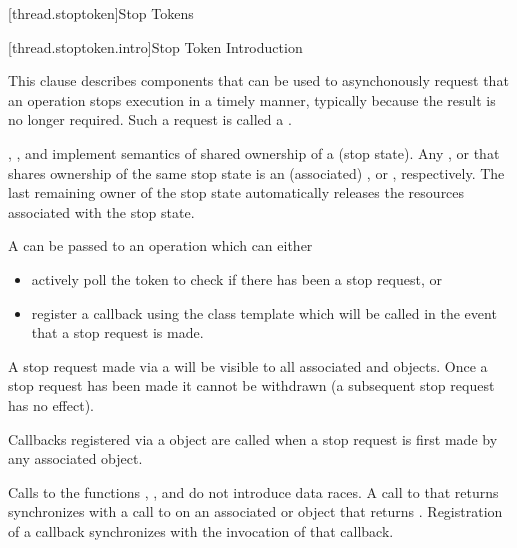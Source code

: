 {\color{insertcolor}

[thread.stoptoken]{Stop Tokens}




[thread.stoptoken.intro]{Stop Token Introduction}

\pnum
This clause describes components that can be used to
asynchonously request that an operation stops execution in a timely
manner, typically because the result is no longer required.
Such a request is called a .

\pnum
{}, , and 
implement semantics of shared ownership of a (stop state).
Any ,  or 
that shares ownership of the same stop state is an (associated)
,  or , respectively.
The last remaining owner of the stop state automatically 
releases the resources associated with the stop state.

\pnum
A  can be passed to an operation which can either
\begin{itemize}
 \item actively poll the token to check if there has been a stop request, or
 \item register a callback using the  class template which
        will be called in the event that a stop request is made.
\end{itemize}
A stop request made via a  will be visible to all
associated  and  objects.
Once a stop request has been made it cannot be withdrawn
(a subsequent stop request has no effect).

\pnum
Callbacks registered via a  object are called when
a stop request is first made by any associated  object.

\pnum
Calls to the functions , ,
and 
do not introduce data races. 
A call to  that returns 
synchronizes with a call to  on an associated 
or  object that returns .
Registration of a callback synchronizes with the invocation of that callback.


}
